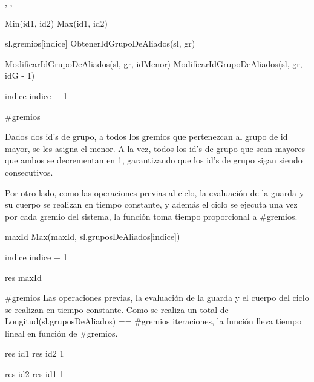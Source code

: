 {, , }{}
{
	\state {} \asig Min(id1, id2)						
	\state {} \asig Max(id1, id2)						
	\state

	\state {} 										

									
		\state

		\state {} \asig sl.gremios[indice]					
		\state {} \asig ObtenerIdGrupoDeAliados(sl, gr)		
		\state

														
			\state ModificarIdGrupoDeAliados(sl, gr, idMenor)					
		\Else {}										
				\state ModificarIdGrupoDeAliados(sl, gr, idG - 1)				
			\endif
		\endif
		\state

		\state indice \asig indice + 1										
	\endwhile
}
{\#gremios}
{ Dados dos id's de grupo, a todos los gremios que pertenezcan al grupo de id mayor, se les asigna el menor. A la vez, todos los id's de grupo que sean mayores que ambos se decrementan en 1, garantizando que los id's de grupo sigan siendo consecutivos.

\hspace{10pt} Por otro lado, como las operaciones previas al ciclo, la evaluaci\'on de la guarda y su cuerpo se realizan en tiempo constante, y adem\'as el ciclo se ejecuta una vez por cada gremio del sistema, la funci\'on toma tiempo proporcional a \#gremios. }

{
	\state {} 									

	\state
	\state {} 								
					
		\state
		
		\state maxId \asig Max(maxId, sl.gruposDeAliados[indice])	

		\state
		\state indice \asig indice + 1								
	\endwhile
	\state

	\state res \asig maxId											
}
{ \#gremios }
{ Las operaciones previas, la evaluaci\'on de la guarda y el cuerpo del ciclo se realizan en tiempo constante. Como se realiza un total de Longitud(sl.gruposDeAliados) == \#gremios iteraciones, la funci\'on lleva tiempo lineal en funci\'on de \#gremios. }

{
						
		\state res \asig id1			
	\Else
		\state res \asig id2			
	\endif
}
{1}
{}

{
						
		\state res \asig id2			
	\Else
		\state res \asig id1			
	\endif
}
{1}
{}